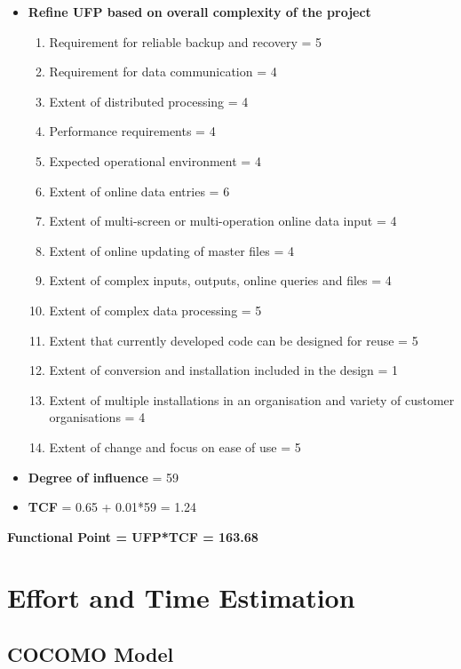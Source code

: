 \documentclass[12pt]{report}
\begin{document}
\begin{itemize}
    \item \textbf{Refine UFP based on overall complexity of the project}
    \begin{enumerate}
        \item Requirement for reliable backup and recovery = 5
        \item Requirement for data communication = 4
        \item Extent of distributed processing = 4
        \item Performance requirements = 4
        \item Expected operational environment = 4
        \item Extent of online data entries = 6
        \item Extent of multi-screen or multi-operation online data input = 4
        \item Extent of online updating of master files = 4
        \item Extent of complex inputs, outputs, online queries and files = 4
        \item Extent of complex data processing = 5
        \item Extent that currently developed code can be designed for reuse = 5
        \item Extent of conversion and installation included in the design = 1
        \item Extent of multiple installations in an organisation and variety of customer organisations = 4
        \item Extent of change and focus on ease of use = 5
    \end{enumerate}
    \item \textbf{Degree of influence} = 59
    \item \textbf{TCF} = 0.65 + 0.01*59 = 1.24
\end{itemize}

\vspace{1cm}

\textbf{Functional Point = UFP*TCF = 163.68}

\chapter{Effort and Time Estimation}

\section{COCOMO Model}
\end{document}
